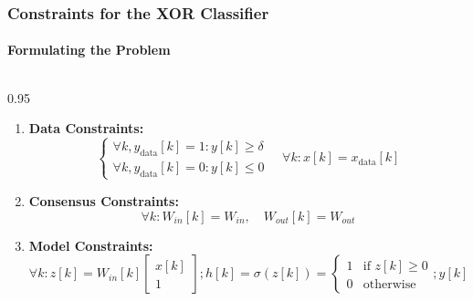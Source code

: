 \documentclass[t, xcolor=table, aspectratio=169]{beamer}
\begin{document}
    \begin{frame}
        \frametitle{Constraints for the XOR Classifier \cite{elser2019learning}}
        \framesubtitle{Formulating the Problem}
        \vspace{-1em}
        \footnotesize
        \setlength{\abovedisplayskip}{2pt}
        \setlength{\belowdisplayskip}{2pt}
        \setlength{\abovedisplayshortskip}{0pt}
        \setlength{\belowdisplayshortskip}{0pt}
        
        \begin{columns}[onlytextwidth,T]
            \begin{column}{0.95\textwidth}
                \begin{enumerate}
                    \setlength\itemsep{0.2em} 
            
                    \item \textbf{Data Constraints:} 
                    \begin{equation*}
                         \begin{cases}
                            \forall k, y_{\text{data}}[k]= 1: y[k] \ge \delta \\[-2pt]
                            \forall k, y_{\text{data}}[k]= 0: y[k] \le 0
                        \end{cases}
                        \quad \forall k: x[k] = x_{\text{data}}[k]
                    \end{equation*}
        
                    \item \textbf{Consensus Constraints:}
                    \begin{equation*}
                         \forall k: W_{in}[k] = W_{in}, \quad W_{out}[k] = W_{out}
                    \end{equation*}
 
                    \item \textbf{Model Constraints:}
                    \begin{equation*}
                        \forall k: z[k] = W_{in}[k]
                        \begin{bmatrix}
                            x[k]\\
                            1
                        \end{bmatrix};
                        h[k] = \sigma(z[k]) = \begin{cases}
                            1 & \text{if } z[k] \ge 0 \\[-2pt]
                            0 & \text{otherwise}
                        \end{cases};
                        y[k] = W_{out}[k]\begin{bmatrix}
                            h[k]\\
                            1
                        \end{bmatrix}
                    \end{equation*}
                \end{enumerate}
            \end{column}
            

\end{columns}
\end{frame}
\end{document}
